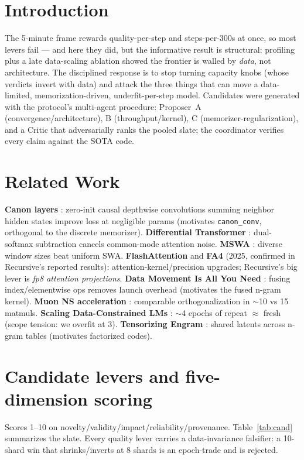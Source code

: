 \documentclass{article}
\begin{document}
\section{Introduction}
The 5-minute frame rewards quality-per-step and steps-per-300s at once, so most levers fail --- and here they did, but the informative result is structural: profiling plus a late data-scaling ablation showed the frontier is walled by \emph{data}, not architecture. The disciplined response is to stop turning capacity knobs (whose verdicts invert with data) and attack the three things that can move a data-limited, memorization-driven, underfit-per-step model. Candidates were generated with the protocol's multi-agent procedure: Proposer~A (convergence/architecture), B (throughput/kernel), C (memorizer-regularization), and a Critic that adversarially ranks the pooled slate; the coordinator verifies every claim against the SOTA code.

\section{Related Work}
\textbf{Canon layers} \cite{allenzhu2025canon}: zero-init causal depthwise convolutions summing neighbor hidden states improve loss at negligible params (motivates \texttt{canon\_conv}, orthogonal to the discrete memorizer). \textbf{Differential Transformer} \cite{ye2024diff}: dual-softmax subtraction cancels common-mode attention noise. \textbf{MSWA} \cite{mswa2025}: diverse window sizes beat uniform SWA. \textbf{FlashAttention} \cite{dao2022flash} and \textbf{FA4} (2025, confirmed in Recursive's reported results): attention-kernel/precision upgrades; Recursive's big lever is \emph{fp8 attention projections}. \textbf{Data Movement Is All You Need} \cite{ivanov2021data}: fusing index/elementwise ops removes launch overhead (motivates the fused n-gram kernel). \textbf{Muon NS acceleration} \cite{muon_ns2026}: comparable orthogonalization in $\sim$10 vs 15 matmuls. \textbf{Scaling Data-Constrained LMs} \cite{muennighoff2023data}: $\sim$4 epochs of repeat $\approx$ fresh (scope tension: we overfit at 3). \textbf{Tensorizing Engram} \cite{engram2606}: shared latents across n-gram tables (motivates factorized codes).

\section{Candidate levers and five-dimension scoring}
Scores 1--10 on novelty/validity/impact/reliability/provenance. Table~\ref{tab:cand} summarizes the slate. Every quality lever carries a data-invariance falsifier: a 10-shard win that shrinks/inverts at 8 shards is an epoch-trade and is rejected.
\end{document}

